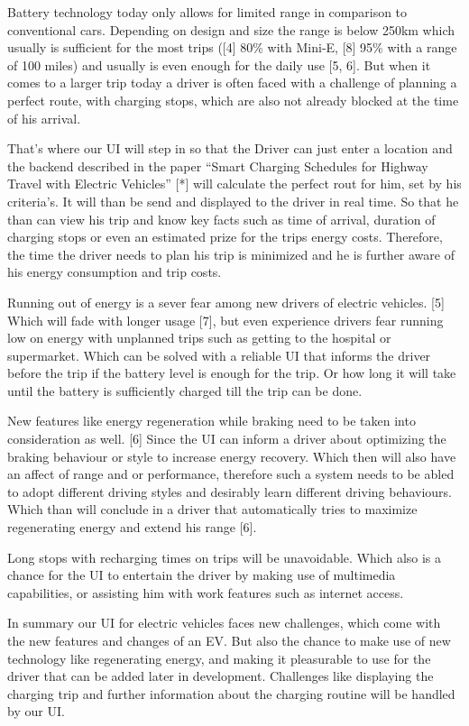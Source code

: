 Battery technology today only allows for limited range in comparison to conventional cars. Depending on design and size the range is below 250km which usually is sufficient for the most trips ([4] 80\% with Mini-E, [8] 95\% with a range of 100 miles) and usually is even enough for the daily use [5, 6]. But when it comes to a larger trip today a driver is often faced with a challenge of planning a perfect route, with charging stops, which are also not already blocked at the time of his arrival.

That’s where our UI will step in so that the Driver can just enter a location and the backend described in the paper “Smart Charging Schedules for Highway Travel with Electric Vehicles” [*] will calculate the perfect rout for him, set by his criteria’s. It will than be send and displayed to the driver in real time. So that he than can view his trip and know key facts such as time of arrival, duration of charging stops or even an estimated prize for the trips energy costs. Therefore, the time the driver needs to plan his trip is minimized and he is further aware of his energy consumption and trip costs.

Running out of energy is a sever fear among new drivers of electric vehicles. [5] Which will fade with longer usage [7], but even experience drivers fear running low on energy with unplanned trips such as getting to the hospital or supermarket. Which can be solved with a reliable UI that informs the driver before the trip if the battery level is enough for the trip. Or how long it will take until the battery is sufficiently charged till the trip can be done. 

New features like energy regeneration while braking need to be taken into consideration as well. [6] Since the UI can inform a driver about optimizing the braking behaviour or style to increase energy recovery. Which then will also have an affect of range and or performance, therefore such a system needs to be abled to adopt different driving styles and desirably learn different driving behaviours. Which than will conclude in a driver that automatically tries to maximize regenerating energy and extend his range [6]. 

Long stops with recharging times on trips will be unavoidable. Which also is a chance for the UI to entertain the driver by making use of multimedia capabilities, or assisting him with work features such as internet access. 

In summary our UI for electric vehicles faces new challenges, which come with the new features and changes of an EV. But also the chance to make use of new technology like regenerating energy, and making it pleasurable to use for the driver that can be added later in development. Challenges like displaying the charging trip and further information about the charging routine will be handled by our UI. 

